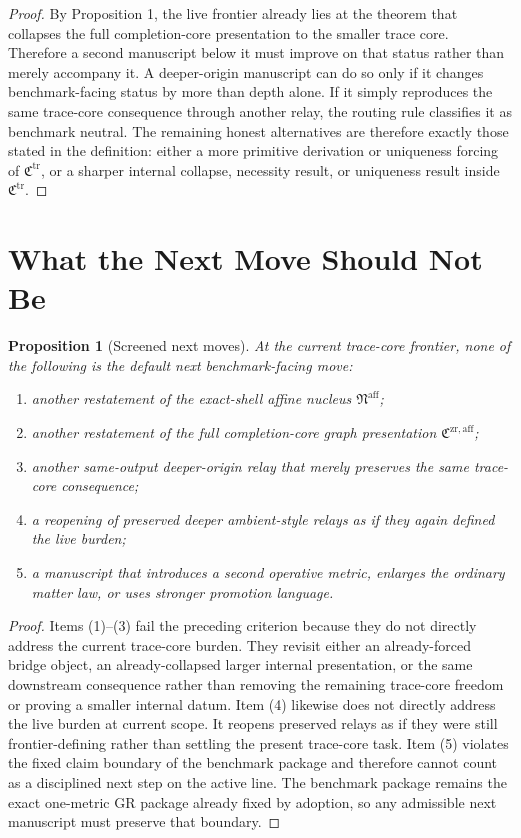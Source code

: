 \documentclass[11pt]{article}
\newcommand{\CompletionCore}{\mathfrak C^{\mathrm{zr,aff}}}
\newcommand{\TraceCore}{\mathfrak C^{\mathrm{tr}}}
\newcommand{\AffineNucleus}{\mathfrak N^{\mathrm{aff}}}
\newtheorem{proposition}{Proposition}
\begin{document}
\begin{proof}
By Proposition 1, the live frontier already lies at the theorem that collapses the full completion-core presentation to the smaller trace core. Therefore a second manuscript below it must improve on that status rather than merely accompany it. A deeper-origin manuscript can do so only if it changes benchmark-facing status by more than depth alone. If it simply reproduces the same trace-core consequence through another relay, the routing rule classifies it as benchmark neutral. The remaining honest alternatives are therefore exactly those stated in the definition: either a more primitive derivation or uniqueness forcing of \(\TraceCore\), or a sharper internal collapse, necessity result, or uniqueness result inside \(\TraceCore\).
\end{proof}

\section{What the Next Move Should Not Be}

\begin{proposition}[Screened next moves]
At the current trace-core frontier, none of the following is the default next benchmark-facing move:
\begin{enumerate}
    \item another restatement of the exact-shell affine nucleus \(\AffineNucleus\);
    \item another restatement of the full completion-core graph presentation \(\CompletionCore\);
    \item another same-output deeper-origin relay that merely preserves the same trace-core consequence;
    \item a reopening of preserved deeper ambient-style relays as if they again defined the live burden;
    \item a manuscript that introduces a second operative metric, enlarges the ordinary matter law, or uses stronger promotion language.
\end{enumerate}
\end{proposition}

\begin{proof}
Items (1)--(3) fail the preceding criterion because they do not directly address the current trace-core burden. They revisit either an already-forced bridge object, an already-collapsed larger internal presentation, or the same downstream consequence rather than removing the remaining trace-core freedom or proving a smaller internal datum. Item (4) likewise does not directly address the live burden at current scope. It reopens preserved relays as if they were still frontier-defining rather than settling the present trace-core task. Item (5) violates the fixed claim boundary of the benchmark package and therefore cannot count as a disciplined next step on the active line. The benchmark package remains the exact one-metric GR package already fixed by adoption, so any admissible next manuscript must preserve that boundary.
\end{proof}
\end{document}

